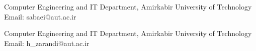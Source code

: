 \documentclass[11pt,a4paper,sans]{moderncv} %
\begin{document}
{Computer Engineering and IT Department, Amirkabir University of Technology\\
	Email: sabaei@aut.ac.ir
}

{Computer Engineering and IT Department, Amirkabir University of Technology\\
Email: h\_zarandi@aut.ac.ir
}




%
%




\end{document}
